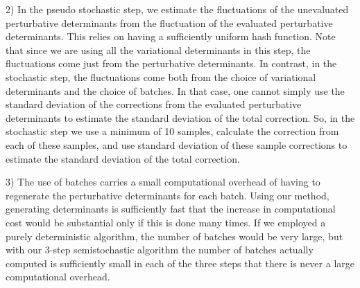 \documentclass[%
preprint,
 superscriptaddress,
 amsmath,amssymb,
 aps,
]{revtex4-1}
\begin{document}
2) In the pseudo stochastic step, we estimate the fluctuations of the unevaluated perturbative determinants from the fluctuation of the evaluated perturbative determinants.
This relies on having a sufficiently uniform hash function.
Note that since we are using all the variational determinants in this step,
the fluctuations come just from the perturbative determinants.
In contrast, in the stochastic step, the fluctuations come both from the choice of variational determinants and the choice of batches.
In that case, one cannot simply use the standard deviation of the corrections from the evaluated perturbative determinants to estimate the standard deviation of the total correction.
So, in the stochastic step we use a minimum of 10 samples, calculate the correction from each of these samples,
and use standard deviation of these sample corrections to estimate the standard deviation of the total correction.

3) The use of batches carries a small computational overhead of having to regenerate the
perturbative determinants for each batch.  Using our method, generating determinants is sufficiently fast that the
increase in computational cost would be substantial only if this is done many times.  If we employed a purely
deterministic algorithm, the number of batches would be very large, but with our 3-step semistochastic algorithm
the number of batches actually computed is sufficiently small in each of the three steps that there is never a large computational overhead.
\end{document}
